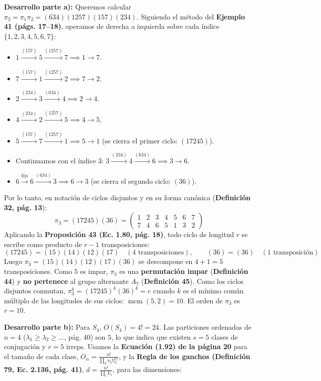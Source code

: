 \documentclass[11pt, a4paper]{article}
\begin{document}
\noindent \textbf{Desarrollo parte a):}
Queremos calcular $\pi_3 = \pi_1 \pi_2 = (634)(1257)(157)(234)$. Siguiendo el método del \textbf{Ejemplo 41 (págs. 17--18)}, operamos de derecha a izquierda sobre cada índice $\{1,2,3,4,5,6,7\}$:
\begin{itemize}
    \item $1 \xrightarrow{(157)} 5 \xrightarrow{(1257)} 7 \implies 1 \to 7$.
    \item $7 \xrightarrow{(157)} 1 \xrightarrow{(1257)} 2 \implies 7 \to 2$.
    \item $2 \xrightarrow{(234)} 3 \xrightarrow{(634)} 4 \implies 2 \to 4$.
    \item $4 \xrightarrow{(234)} 2 \xrightarrow{(1257)} 5 \implies 4 \to 5$.
    \item $5 \xrightarrow{(157)} 7 \xrightarrow{(1257)} 1 \implies 5 \to 1$ (se cierra el primer ciclo: $(17245)$).
    \item Continuamos con el índice $3$: $3 \xrightarrow{(234)} 4 \xrightarrow{(634)} 6 \implies 3 \to 6$.
    \item $6 \xrightarrow{\text{fijo}} 6 \xrightarrow{(634)} 3 \implies 6 \to 3$ (se cierra el segundo ciclo: $(36)$).
\end{itemize}
Por lo tanto, en notación de ciclos disjuntos y en su forma canónica (\textbf{Definición 32, pág. 13}):
\[
\pi_3 = (17245)(36) = \begin{pmatrix} 1 & 2 & 3 & 4 & 5 & 6 & 7 \\ 7 & 4 & 6 & 5 & 1 & 3 & 2 \end{pmatrix}
\]
Aplicando la \textbf{Proposición 43 (Ec. 1.80, pág. 18)}, todo ciclo de longitud $r$ se escribe como producto de $r-1$ transposiciones:
\[
(17245) = (15)(14)(12)(17) \quad (4 \text{ transposiciones}), \qquad (36) = (36) \quad (1 \text{ transposición})
\]
Luego $\pi_3 = (15)(14)(12)(17)(36)$ se descompone en $4 + 1 = 5$ transposiciones. Como $5$ es impar, $\pi_3$ es una \textbf{permutación impar} (\textbf{Definición 44}) y \textbf{no pertenece} al grupo alternante $A_7$ (\textbf{Definición 45}). Como los ciclos disjuntos conmutan, $\pi_3^k = (17245)^k (36)^k = e$ cuando $k$ es el mínimo común múltiplo de las longitudes de sus ciclos: $\operatorname{mcm}(5, 2) = 10$. El orden de $\pi_3$ es $r = 10$.

\vspace{2mm}
\noindent \textbf{Desarrollo parte b):}
Para $S_4$, $O(S_4) = 4! = 24$. Las particiones ordenadas de $n=4$ ($\lambda_1 \ge \lambda_2 \ge \dots$, pág. 40) son $5$, lo que indica que existen $s = 5$ clases de conjugación y $r = 5$ irreps. Usamos la \textbf{Ecuación (1.92) de la página 20} para el tamaño de cada clase, $O_\alpha = \frac{n!}{\prod_k \nu_k! l_k^{\nu_k}}$, y la \textbf{Regla de los ganchos (Definición 79, Ec. 2.136, pág. 41)}, $d = \frac{n!}{\prod_i L_i}$, para las dimensiones:
\end{document}
